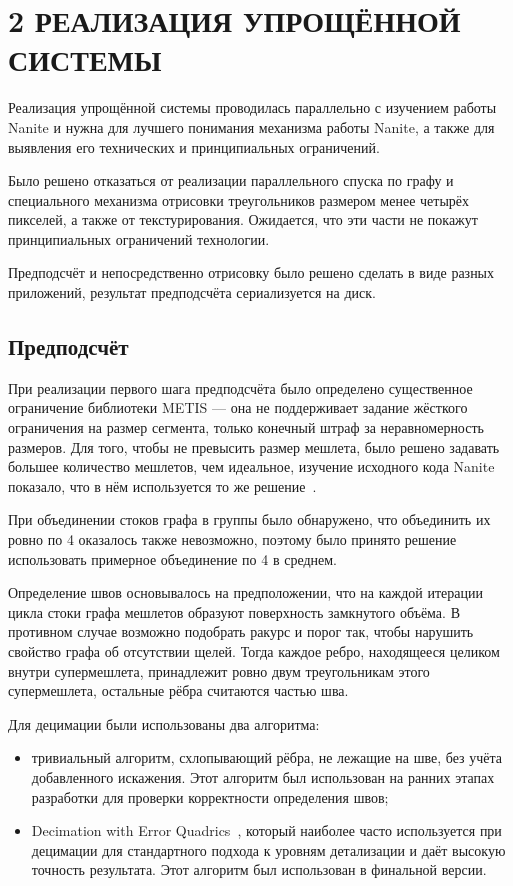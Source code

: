\clearpage
\section{2 РЕАЛИЗАЦИЯ УПРОЩЁННОЙ СИСТЕМЫ}
Реализация упрощённой системы проводилась параллельно с изучением работы Nanite и нужна для лучшего понимания механизма работы Nanite, а также для выявления его технических и принципиальных ограничений.

Было решено отказаться от реализации параллельного спуска по графу и специального механизма отрисовки треугольников размером менее четырёх пикселей, а также от текстурирования.
Ожидается, что эти части не покажут принципиальных ограничений технологии.

Предподсчёт и непосредственно отрисовку было решено сделать в виде разных приложений, результат предподсчёта сериализуется на диск.

\subsection*{Предподсчёт}
При реализации первого шага предподсчёта было определено существенное ограничение библиотеки METIS --- она не поддерживает задание жёсткого ограничения на размер сегмента, только конечный штраф за неравномерность размеров.
Для того, чтобы не превысить размер мешлета, было решено задавать большее количество мешлетов, чем идеальное, изучение исходного кода Nanite показало, что в нём используется то же решение~\cite{NaniteSrcMETIS}.

При объединении стоков графа в группы было обнаружено, что объединить их ровно по 4 оказалось также невозможно, поэтому было принято решение использовать примерное объединение по 4 в среднем.

Определение швов основывалось на предположении, что на каждой итерации цикла стоки графа мешлетов образуют поверхность замкнутого объёма.
В противном случае возможно подобрать ракурс и порог так, чтобы нарушить свойство графа об отсутствии щелей.
Тогда каждое ребро, находящееся целиком внутри супермешлета, принадлежит ровно двум треугольникам этого супермешлета, остальные рёбра считаются частью шва.

Для децимации были использованы два алгоритма:
\begin{itemize}
    \item тривиальный алгоритм, схлопывающий рёбра, не лежащие на шве, без учёта добавленного искажения.
    Этот алгоритм был использован на ранних этапах разработки для проверки корректности определения швов;
    \item Decimation with Error Quadrics~\cite{DecimationQuadrics}, который наиболее часто используется при децимации для стандартного подхода к уровням детализации и даёт высокую точность результата.
    Этот алгоритм был использован в финальной версии.
\end{itemize}

